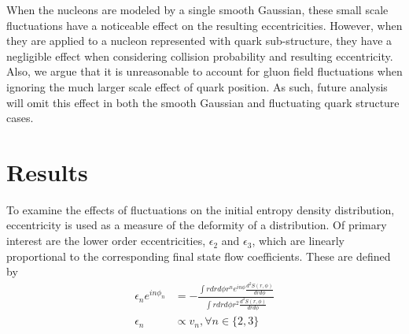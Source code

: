 \documentclass[preprint,showpacs,amsfonts,aps,prl,nofootinbib,floatfix]{revtex4}
\begin{document}
When the nucleons are modeled by a single smooth Gaussian, these small scale fluctuations have a noticeable effect on the resulting eccentricities. However, when they are applied to a nucleon represented with quark sub-structure, they have a negligible effect when considering collision probability and resulting eccentricity. Also, we argue that it is unreasonable to account for gluon field fluctuations when ignoring the much larger scale effect of quark position. As such, future analysis will omit this effect in both the smooth Gaussian and fluctuating quark structure cases.

\section{Results}
\label{sec:Results}
To examine the effects of fluctuations on the initial entropy density distribution, eccentricity is used as a measure of the deformity of a distribution. Of primary interest are the lower order eccentricities, $\epsilon_2$ and $\epsilon_3$, which are linearly proportional to the corresponding final state flow coefficients. These are defined by
\begin{align}
	\epsilon_n e^{i n\phi_n}& = -\frac{\int r dr d\phi r^n e^{i n \phi} \frac{d^2 S(r,\phi)}{dr d\phi}}{\int r dr d\phi r^2 \frac{d^2 S(r,\phi)}{dr d\phi}}\\
	\epsilon_n &\propto v_n, \forall n \in \{2,3\}
\end{align}
\end{document}
